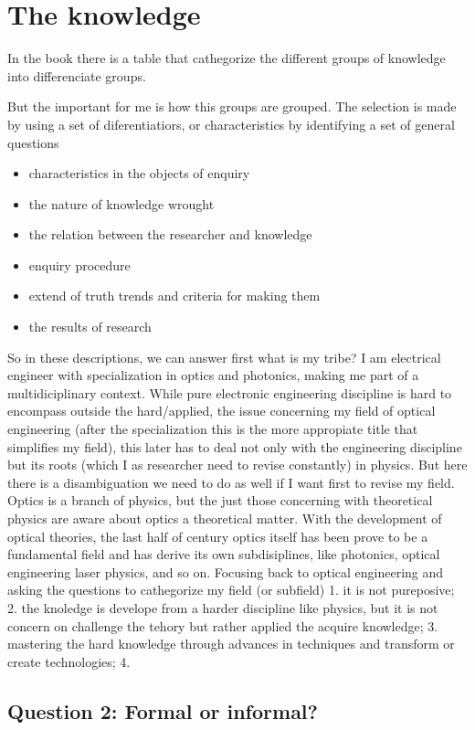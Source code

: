 \documentclass[a4paper, 11pt]{article}
\begin{document}
\section*{The knowledge}
In the book there is a table that cathegorize the different groups of knowledge into differenciate groups. 

But the important for me is how this groups are grouped. The selection is made by using a set of diferentiatiors, or characteristics by identifying a set of general questions
	\begin{itemize}
		\item characteristics in the objects of enquiry
		\item the nature of knowledge wrought
		\item the relation between the researcher and knowledge
		\item enquiry procedure
		\item extend of truth trends and criteria for making them
		\item the results of research
\end{itemize}	
So in these descriptions, we can answer first what is my tribe? I am electrical engineer with specialization in optics and photonics, making me part of a multidiciplinary context. While pure electronic engineering discipline is hard to encompass outside the hard/applied, the issue concerning my field of optical engineering (after the specialization this is the more appropiate title that simplifies my field), this later has to deal not only with the engineering discipline but its roots (which I as researcher need to revise constantly) in physics. But here there is a disambiguation we need to do as well if I want first to revise my field. Optics is a branch of physics, but the just those concerning with theoretical physics are aware about optics a theoretical matter. With the development of optical theories, the last half of century optics itself has been prove to be a fundamental field and has derive its own subdisiplines, like photonics, optical engineering laser physics, and so on. Focusing back to optical engineering and asking the questions to cathegorize my field (or subfield) 1. it is not pureposive; 2. the knoledge is develope from a harder discipline like physics, but it is not concern on challenge the tehory but rather applied the acquire knowledge; 3. mastering the hard knowledge through advances in techniques and transform or create technologies; 4.


\subsection*{Question 2: Formal or informal?} 
\end{document}
